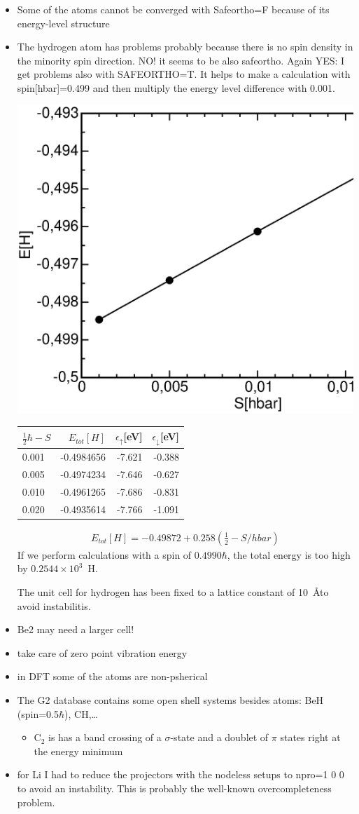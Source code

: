 \documentclass{book}
\begin{document}
\begin{itemize}
\item Some of the atoms cannot be converged with Safeortho=F because of 
its energy-level structure
\item The hydrogen atom has problems probably because there is no spin
density in the minority spin direction. NO! it seems to be also
safeortho. Again YES: I get problems also with SAFEORTHO=T. It helps
to make a calculation with spin[hbar]=0.499 and then multiply the
energy level difference with 0.001. 
\begin{center}
\includegraphics[width=0.5\linewidth,clip=t]{Figs/hydrogenetot.eps}
\begin{tabular}{|l|r|r|r|}
\hline
$\frac{1}{2}\hbar-S$ & $E_{tot}[H]$ & $\epsilon_\uparrow$[eV]& $\epsilon_\downarrow$[eV] \\
\hline
0.001 &  -0.4984656 &  -7.621&   -0.388 \\
0.005 &  -0.4974234 &  -7.646&   -0.627\\ 
0.010 &  -0.4961265 &  -7.686&   -0.831 \\
0.020 &  -0.4935614 &  -7.766&   -1.091 \\
\hline
\end{tabular}
\end{center}
\begin{eqnarray*}
E_{tot}[H]=-0.49872+0.258(\frac{1}{2}-S/hbar)
\end{eqnarray*}
If we perform calculations with a spin of $0.4990 \hbar$, the total
energy is too high by $0.2544\times 10^3$~H.

The unit cell for hydrogen has been fixed to a lattice constant of
10~\AA to avoid instabilitis.

\item Be2 may need a larger cell!
\item take care of zero point vibration energy
\item in DFT some of the atoms are non-psherical
\item The G2 database contains some open shell systems besides atoms:
BeH (spin=0.5$\hbar$), CH,\ldots
\begin{itemize}
\item C$_2$ is has a band crossing of a $\sigma$-state and a doublet of
$\pi$ states right at the energy minimum
\end{itemize}
\item for Li I had to reduce the projectors with the nodeless
  setups to npro=1 0 0 to avoid an instability. This is probably
  the well-known overcompleteness problem.
\end{itemize}
\end{document}
